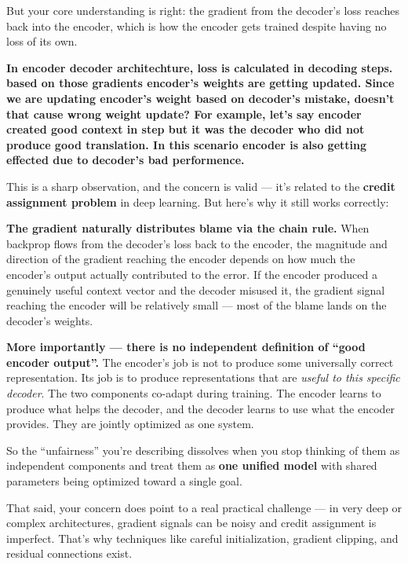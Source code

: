 But your core understanding is right: the gradient from the decoder's loss reaches back into the encoder, which is how the encoder gets trained despite having no loss of its own.

\bigskip

\textbf{In encoder decoder architechture, loss is calculated in decoding steps. based on those gradients encoder's weights are getting updated. Since we are updating encoder's weight based on decoder's mistake, doesn't that cause wrong weight update? For example, let's say encoder created good context in step but it was the decoder who did not produce good translation. In this scenario encoder is also getting effected due to decoder's bad performence.}

This is a sharp observation, and the concern is valid --- it's related to the \textbf{credit assignment problem} in deep learning. But here's why it still works correctly:

\textbf{The gradient naturally distributes blame via the chain rule.} When backprop flows from the decoder's loss back to the encoder, the magnitude and direction of the gradient reaching the encoder depends on how much the encoder's output actually contributed to the error. If the encoder produced a genuinely useful context vector and the decoder misused it, the gradient signal reaching the encoder will be relatively small --- most of the blame lands on the decoder's weights.

\textbf{More importantly --- there is no independent definition of ``good encoder output''.} The encoder's job is not to produce some universally correct representation. Its job is to produce representations that are \textit{useful to this specific decoder}. The two components co-adapt during training. The encoder learns to produce what helps the decoder, and the decoder learns to use what the encoder provides. They are jointly optimized as one system.

So the ``unfairness'' you're describing dissolves when you stop thinking of them as independent components and treat them as \textbf{one unified model} with shared parameters being optimized toward a single goal.

That said, your concern does point to a real practical challenge --- in very deep or complex architectures, gradient signals can be noisy and credit assignment is imperfect. That's why techniques like careful initialization, gradient clipping, and residual connections exist.

\bigskip

